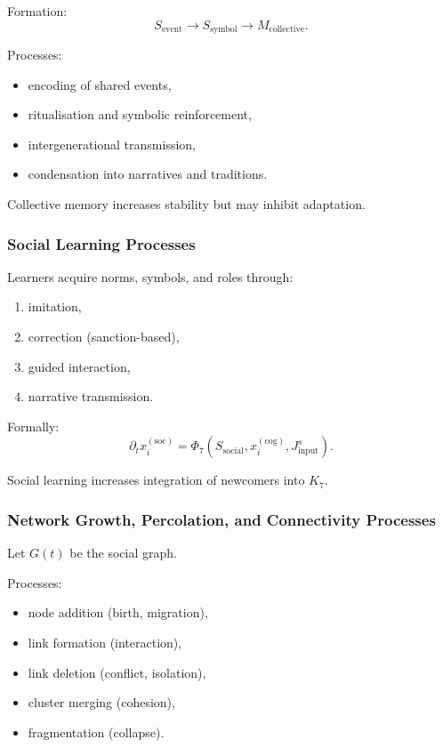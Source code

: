 Formation:
\[
S_{\text{event}} \to S_{\text{symbol}} \to M_{\text{collective}}.
\]

Processes:
\begin{itemize}
    \item encoding of shared events,
    \item ritualisation and symbolic reinforcement,
    \item intergenerational transmission,
    \item condensation into narratives and traditions.
\end{itemize}

Collective memory increases stability but may inhibit adaptation.

\subsubsection{Social Learning Processes}

Learners acquire norms, symbols, and roles through:
\begin{enumerate}
    \item imitation,
    \item correction (sanction-based),
    \item guided interaction,
    \item narrative transmission.
\end{enumerate}

Formally:
\[
\partial_t x_i^{(\text{soc})}
= \Phi_7(S_{\text{social}}, x_i^{(\text{cog})}, J^{s}_{\text{input}}).
\]

Social learning increases integration of newcomers into $K_7$.

\subsubsection{Network Growth, Percolation, and Connectivity Processes}

Let $G(t)$ be the social graph.

Processes:
\begin{itemize}
    \item node addition (birth, migration),
    \item link formation (interaction),
    \item link deletion (conflict, isolation),
    \item cluster merging (cohesion),
    \item fragmentation (collapse).
\end{itemize}

